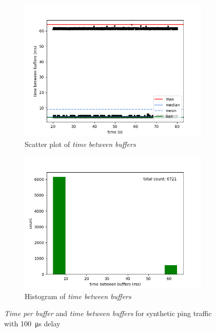 \begin{figure}[H]
    \begin{subfigure}[t]{0.5\textwidth}
        \centering
        \includegraphics[scale=0.45]{img/synthetic_pings_wait_100us_between_buffers_scatter.png}
        \caption{Scatter plot of \textit{time between buffers}}
    \end{subfigure}%
    \begin{subfigure}[t]{0.5\textwidth}
        \centering
        \includegraphics[scale=0.45]{img/synthetic_pings_wait_100us_between_buffers_hist.png}
        \caption{Histogram of \textit{time between buffers}}
    \end{subfigure}

    \caption{\textit{Time per buffer} and \textit{time between buffers} for synthetic ping traffic with \SI{100}{\micro\second} delay}
    \label{evaluation/results/synthetic-ping-instructions-100us-delay/plots}
\end{figure}

